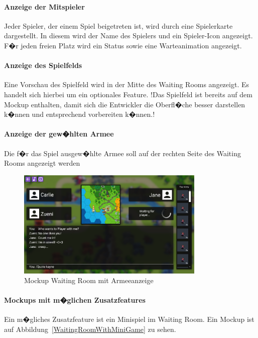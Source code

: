 \documentclass[12pt, titlepage]{scrartcl}
\newcommand{\Abb}[1]{%
	Abbildung\ \ref{#1}%
}
\begin{document}
		\paragraph{Anzeige der Mitspieler}
		Jeder Spieler, der einem Spiel beigetreten ist, wird durch eine \glqq Spielerkarte \grqq dargestellt. In diesem wird der Name des Spielers und ein Spieler-Icon angezeigt. F�r jeden freien Platz wird ein Status sowie eine Warteanimation angezeigt.  
		\paragraph{Anzeige des Spielfelds}
		Eine Vorschau des Spielfeld wird in der Mitte des Waiting Rooms angezeigt. Es handelt sich hierbei um ein optionales Feature. !Das Spielfeld ist bereits auf dem Mockup enthalten, damit sich die Entwickler die Oberfl�che besser darstellen k�nnen und entsprechend vorbereiten k�nnen.!
		\paragraph{Anzeige der gew�hlten Armee}
		Die f�r das Spiel ausgew�hlte Armee soll auf der rechten Seite des Waiting Rooms angezeigt werden
		
		\begin{figure}[H] 
			\centering
			\includegraphics[width=0.8\textwidth]{Waiting_Room_Game_mit_ArmyView.png}
			\caption{Mockup Waiting Room mit Armeeanzeige}
			\label{WaitingRoomWithArmy}
		\end{figure}
	
		\paragraph{Mockups mit m�glichen Zusatzfeatures}
		Ein m�gliches Zusatzfeature ist ein Minispiel im Waiting Room. Ein Mockup ist auf \Abb{WaitingRoomWithMiniGame} zu sehen.
		
\end{document}
